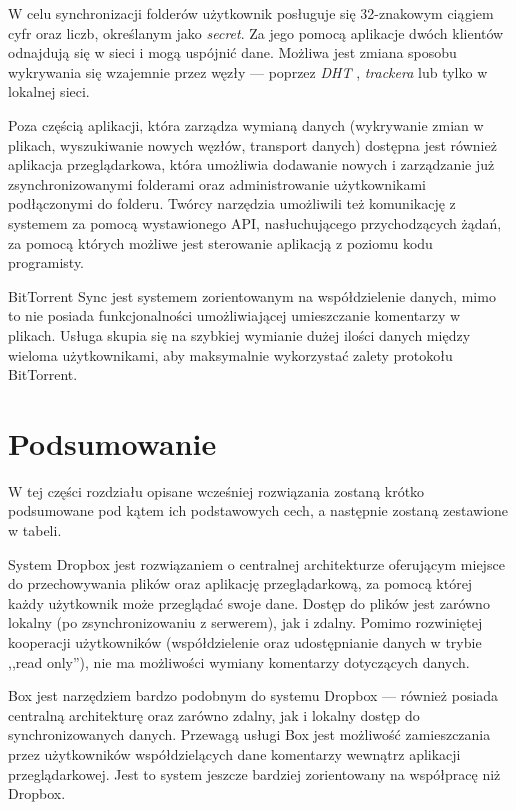 W celu synchronizacji folderów użytkownik posługuje się 32-znakowym ciągiem cyfr oraz liczb, określanym jako \emph{secret}. Za jego pomocą aplikacje dwóch klientów odnajdują się w sieci i mogą uspójnić dane. Możliwa jest zmiana sposobu wykrywania się wzajemnie przez węzły --- poprzez \emph{DHT} \cite{dht} \cite{dhtarticle} \cite{dhtarticle2}, \emph{trackera} lub tylko w lokalnej sieci.

Poza częścią aplikacji, która zarządza wymianą danych (wykrywanie zmian w plikach, wyszukiwanie nowych węzłów, transport danych) dostępna jest również aplikacja przeglądarkowa, która umożliwia dodawanie nowych i zarządzanie już zsynchronizowanymi folderami oraz administrowanie użytkownikami podłączonymi do folderu. Twórcy narzędzia umożliwili też komunikację z systemem za pomocą wystawionego API, nasłuchującego przychodzących żądań, za pomocą których możliwe jest sterowanie aplikacją z poziomu kodu programisty.

BitTorrent Sync jest systemem zorientowanym na współdzielenie danych, mimo to nie posiada funkcjonalności umożliwiającej umieszczanie komentarzy w plikach. Usługa skupia się na szybkiej wymianie dużej ilości danych między wieloma użytkownikami, aby maksymalnie wykorzystać zalety protokołu BitTorrent.

\section*{Podsumowanie}

W tej części rozdziału opisane wcześniej rozwiązania zostaną krótko podsumowane pod kątem ich podstawowych cech, a następnie zostaną zestawione w tabeli.

System Dropbox jest rozwiązaniem o centralnej architekturze oferującym miejsce do przechowywania plików oraz aplikację przeglądarkową, za pomocą której każdy użytkownik może przeglądać swoje dane. Dostęp do plików jest zarówno lokalny (po zsynchronizowaniu z serwerem), jak i zdalny. Pomimo rozwiniętej kooperacji użytkowników (współdzielenie oraz udostępnianie danych w trybie ,,read only''), nie ma możliwości wymiany komentarzy dotyczących danych.

Box jest narzędziem bardzo podobnym do systemu Dropbox --- również posiada centralną architekturę oraz zarówno zdalny, jak i lokalny dostęp do synchronizowanych danych. Przewagą usługi Box jest możliwość zamieszczania przez użytkowników współdzielących dane komentarzy wewnątrz aplikacji przeglądarkowej. Jest to system jeszcze bardziej zorientowany na współpracę niż Dropbox.

